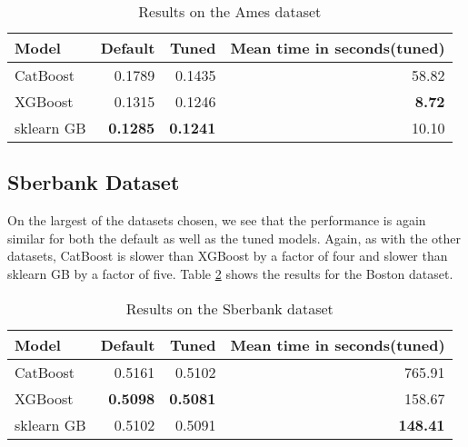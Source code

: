 \begin{table}
				\centering
				\begin{tabular}{lrrr}
					\toprule
					\textbf{Model} & \textbf{Default} & \textbf{Tuned} & \textbf{Mean time in seconds(tuned)} \\
					\midrule
					CatBoost & 0.1789 &  0.1435  & 58.82\\
					XGBoost & 0.1315 & 0.1246 & \textbf{8.72} \\
					sklearn GB & \textbf{0.1285} & \textbf{0.1241} & 10.10 \\
					\bottomrule
				\end{tabular}
                \caption{Results on the Ames dataset}
				\label{tab:ames_results}
			\end{table}

\subsection{Sberbank Dataset}
On the largest of the datasets chosen, we see that the performance is again similar for both the default as well as the tuned models. Again, as with the other datasets, CatBoost is slower than XGBoost by a factor of four and slower than sklearn GB by a factor of five. Table \cref{tab:sberbank_results} shows the results for the Boston dataset.

\begin{table}
				\centering
				\begin{tabular}{lrrr}
					\toprule
					\textbf{Model} & \textbf{Default} & \textbf{Tuned} & \textbf{Mean time in seconds(tuned)} \\
					\midrule
					CatBoost & 0.5161 &  0.5102  & 765.91 \\
					XGBoost & \textbf{0.5098} & \textbf{0.5081} & 158.67 \\
					sklearn GB & 0.5102 & 0.5091 & \textbf{148.41} \\
					\bottomrule
				\end{tabular}
                \caption{Results on the Sberbank dataset}
				\label{tab:sberbank_results}
			\end{table}
